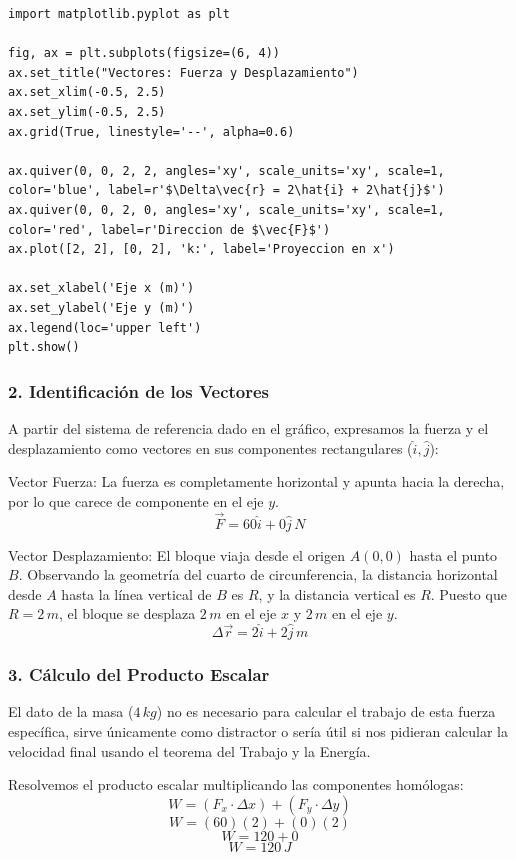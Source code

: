 \documentclass[12pt, a4paper]{article}
\begin{document}
\begin{lstlisting}
import matplotlib.pyplot as plt

fig, ax = plt.subplots(figsize=(6, 4))
ax.set_title("Vectores: Fuerza y Desplazamiento")
ax.set_xlim(-0.5, 2.5)
ax.set_ylim(-0.5, 2.5)
ax.grid(True, linestyle='--', alpha=0.6)

ax.quiver(0, 0, 2, 2, angles='xy', scale_units='xy', scale=1, color='blue', label=r'$\Delta\vec{r} = 2\hat{i} + 2\hat{j}$')
ax.quiver(0, 0, 2, 0, angles='xy', scale_units='xy', scale=1, color='red', label=r'Direccion de $\vec{F}$')
ax.plot([2, 2], [0, 2], 'k:', label='Proyeccion en x')

ax.set_xlabel('Eje x (m)')
ax.set_ylabel('Eje y (m)')
ax.legend(loc='upper left')
plt.show()
\end{lstlisting}

\subsubsection*{2. Identificación de los Vectores}
A partir del sistema de referencia dado en el gráfico, expresamos la fuerza y el desplazamiento como vectores en sus componentes rectangulares ($\hat{i}, \hat{j}$):

Vector Fuerza: La fuerza es completamente horizontal y apunta hacia la derecha, por lo que carece de componente en el eje $y$.
$$ \vec{F} = 60\hat{i} + 0\hat{j} \, \si{N} $$

Vector Desplazamiento: El bloque viaja desde el origen $A(0,0)$ hasta el punto $B$. Observando la geometría del cuarto de circunferencia, la distancia horizontal desde $A$ hasta la línea vertical de $B$ es $R$, y la distancia vertical es $R$. Puesto que $R = 2 \, \si{m}$, el bloque se desplaza $2 \, \si{m}$ en el eje $x$ y $2 \, \si{m}$ en el eje $y$.
$$ \Delta\vec{r} = 2\hat{i} + 2\hat{j} \, \si{m} $$

\subsubsection*{3. Cálculo del Producto Escalar}
El dato de la masa ($4 \, \si{kg}$) no es necesario para calcular el trabajo de esta fuerza específica, sirve únicamente como distractor o sería útil si nos pidieran calcular la velocidad final usando el teorema del Trabajo y la Energía.

Resolvemos el producto escalar multiplicando las componentes homólogas:
$$ W = (F_x \cdot \Delta x) + (F_y \cdot \Delta y) $$
$$ W = (60)(2) + (0)(2) $$
$$ W = 120 + 0 $$
$$ \boxed{W = 120 \, \si{J}} $$
\end{document}
